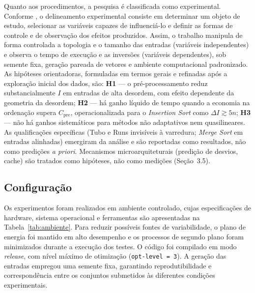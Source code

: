 \documentclass[portuguese]{sbc2025}%
\begin{document}
Quanto aos procedimentos, a pesquisa é classificada como experimental. Conforme \citep{gil_metodos_2019}, o delineamento experimental consiste em determinar um objeto de estudo, selecionar as variáveis capazes de influenciá-lo e definir as formas de controle e de observação dos efeitos produzidos. Assim, o trabalho manipula de forma controlada a topologia e o tamanho das entradas (variáveis independentes) e observa o tempo de execução e as inversões (variáveis dependentes), sob semente fixa, geração pareada de vetores e ambiente computacional padronizado. As hipóteses orientadoras, formuladas em termos gerais e refinadas após a exploração inicial dos dados, são: \textbf{H1} — o pré-processamento reduz substancialmente $I$ em entradas de alta desordem, com efeito dependente da geometria da desordem; \textbf{H2} — há ganho líquido de tempo quando a economia na ordenação supera $C_{\text{pre}}$, operacionalizada para o \emph{Insertion Sort} como $\Delta I \gtrsim 5n$; \textbf{H3} — não há ganhos sistemáticos para métodos não adaptativos nem quasilineares. As qualificações específicas (Tubo e Runs invisíveis à varredura; \emph{Merge Sort} em entradas alinhadas) emergiram da análise e são reportadas como resultados, não como predições \emph{a priori}. Mecanismos microarquiteturais (predição de desvios, cache) são tratados como hipóteses, não como medições (Seção~3.5).

\subsection{Configuração}

Os experimentos foram realizados em ambiente controlado, cujas especificações de hardware, sistema operacional e ferramentas são apresentadas na Tabela~\ref{tab:ambiente}. Para reduzir possíveis fontes de variabilidade, o plano de energia foi mantido em alto desempenho e os processos de segundo plano foram minimizados durante a execução dos testes. O código foi compilado em modo \emph{release}, com nível máximo de otimização (\texttt{opt-level = 3}). A geração das entradas empregou uma semente fixa, garantindo reprodutibilidade e correspondência entre os conjuntos submetidos às diferentes condições experimentais.
\end{document}
